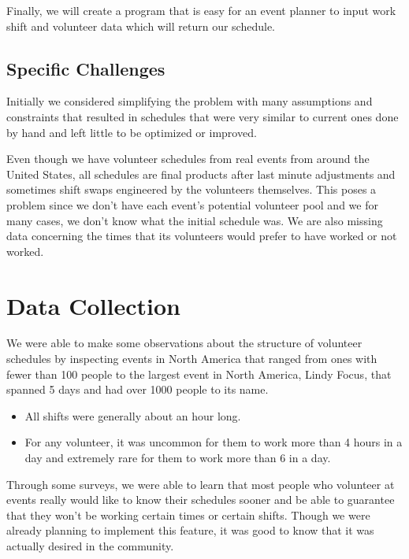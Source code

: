 \documentclass[11pt]{article}
\theoremstyle{definition}
\begin{document}
\begin{multicols}{2}
Finally, we will create a program that is easy for an event planner to input work shift and volunteer data which will return our schedule.

\subsection{Specific Challenges}
Initially we considered simplifying the problem with many assumptions and constraints that resulted in schedules that were very similar to current ones done by hand and left little to be optimized or improved.

Even though we have volunteer schedules from real events from around the United States, all schedules are final products after last minute adjustments and sometimes shift swaps engineered by the volunteers themselves.
This poses a problem since we don't have each event's potential volunteer pool and we for many cases, we don't know what the initial schedule was.
We are also missing data concerning the times that its volunteers would prefer to have worked or not worked.

%
%
\section{Data Collection}
We were able to make some observations about the structure of volunteer schedules by inspecting events in North America that ranged from ones with fewer than 100 people to the largest event in North America, Lindy Focus, that spanned 5 days and had over 1000 people to its name.
\begin{itemize}\itemsep0pt
\item All shifts were generally about an hour long.
\item For any volunteer, it was uncommon for them to work more than 4 hours in a day and extremely rare for them to work more than 6 in a day.
\end{itemize}

Through some surveys, we were able to learn that most people who volunteer at events really would like to know their schedules sooner and be able to guarantee that they won't be working certain times or certain shifts.
Though we were already planning to implement this feature, it was good to know that it was actually desired in the community.


\end{multicols}
\end{document}
